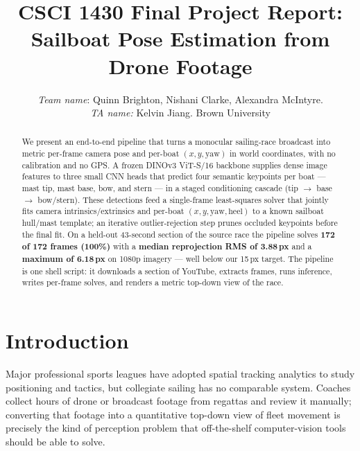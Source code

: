 \documentclass[10pt,twocolumn,letterpaper]{article}
\begin{document}
\title{CSCI 1430 Final Project Report:\\Sailboat Pose Estimation from Drone Footage}

\author{
    \emph{Team name}: Quinn Brighton, Nishani Clarke, Alexandra McIntyre.\\
    \emph{TA name:} Kelvin Jiang.
    Brown University\\
}

\maketitle

\begin{abstract}
We present an end-to-end pipeline that turns a monocular sailing-race broadcast into metric per-frame camera pose and per-boat $(x, y, \mathrm{yaw})$ in world coordinates, with no calibration and no GPS.  A frozen DINOv3 ViT-S/16 backbone supplies dense image features to three small CNN heads that predict four semantic keypoints per boat --- mast tip, mast base, bow, and stern --- in a staged conditioning cascade (tip $\rightarrow$ base $\rightarrow$ bow/stern).  These detections feed a single-frame least-squares solver that jointly fits camera intrinsics/extrinsics and per-boat $(x, y, \mathrm{yaw}, \mathrm{heel})$ to a known sailboat hull/mast template; an iterative outlier-rejection step prunes occluded keypoints before the final fit.  On a held-out 43-second section of the source race the pipeline solves \textbf{172 of 172 frames (100\%)} with a \textbf{median reprojection RMS of 3.88\,px} and a \textbf{maximum of 6.18\,px} on 1080p imagery --- well below our 15\,px target.  The pipeline is one shell script: it downloads a section of YouTube, extracts frames, runs inference, writes per-frame solves, and renders a metric top-down view of the race.
\end{abstract}

\section{Introduction}

Major professional sports leagues have adopted spatial tracking analytics to study positioning and tactics, but collegiate sailing has no comparable system.  Coaches collect hours of drone or broadcast footage from regattas and review it manually; converting that footage into a quantitative top-down view of fleet movement is precisely the kind of perception problem that off-the-shelf computer-vision tools should be able to solve.
\end{document}
